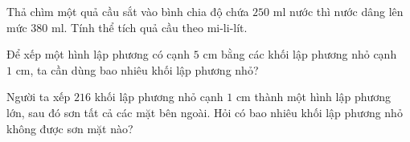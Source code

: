 \begin{ex} %
Thả chìm một quả cầu sắt vào bình chia độ chứa $250\text{ ml}$ nước thì nước dâng lên mức $380\text{ ml}$. Tính thể tích quả cầu theo mi-li-lít.
\end{ex}

\begin{ex} %
Để xếp một hình lập phương có cạnh $5\text{ cm}$ bằng các khối lập phương nhỏ cạnh $1\text{ cm}$, ta cần dùng bao nhiêu khối lập phương nhỏ?
\end{ex}

\begin{ex} %
Người ta xếp $216$ khối lập phương nhỏ cạnh $1\text{ cm}$ thành một hình lập phương lớn, sau đó sơn tất cả các mặt bên ngoài. Hỏi có bao nhiêu khối lập phương nhỏ không được sơn mặt nào?
\end{ex}
